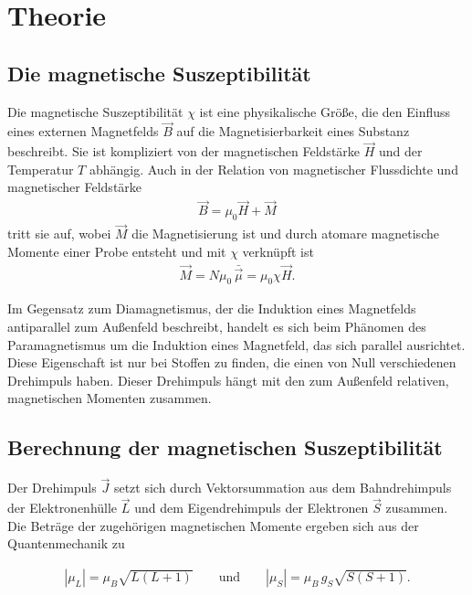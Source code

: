 
\section{Theorie}
\setcounter{page}{1}
\subsection{Die magnetische Suszeptibilität}
Die magnetische Suszeptibilität $\chi$ ist eine physikalische Größe, die den Einfluss eines externen Magnetfelds $\vec B$ auf
die Magnetisierbarkeit eines Substanz beschreibt. Sie ist kompliziert von der magnetischen Feldstärke $\vec H$ und der Temperatur $T$
abhängig. Auch in der Relation von magnetischer Flussdichte und magnetischer Feldstärke 
\begin{align}
 \vec B = \mu_0 \vec H + \vec M
\end{align}
tritt sie auf, wobei $\vec M$ die Magnetisierung ist und durch atomare magnetische Momente einer Probe entsteht und mit $\chi$ verknüpft ist
\begin{align}
 \vec M = N \mu_0 \,  \bar{\vec{\mu}} =\mu_0 \chi \vec H.
 \label{eqMagnetisierung}
\end{align}

Im Gegensatz zum Diamagnetismus, der die Induktion eines Magnetfelds antiparallel zum Außenfeld beschreibt, handelt es sich beim
Phänomen des Paramagnetismus um die Induktion eines Magnetfeld, das sich parallel ausrichtet. Diese Eigenschaft ist nur bei Stoffen
zu finden, die einen von Null verschiedenen Drehimpuls haben. Dieser Drehimpuls hängt mit den zum Außenfeld relativen, magnetischen 
Momenten zusammen.

\subsection{Berechnung der magnetischen Suszeptibilität}
Der Drehimpuls $\vec J$ setzt sich durch Vektorsummation aus dem Bahndrehimpuls der Elektronenhülle $\vec L$ und dem Eigendrehimpuls der Elektronen 
$\vec S$ zusammen. Die Beträge der zugehörigen magnetischen Momente ergeben sich aus der Quantenmechanik zu

\begin{align}
 | \mu_L | = \mu_B \sqrt{L(L+1)} \qquad \text{und} \qquad |\mu_S| = \mu_B \, g_S \sqrt{S(S+1)}.
\end{align}

